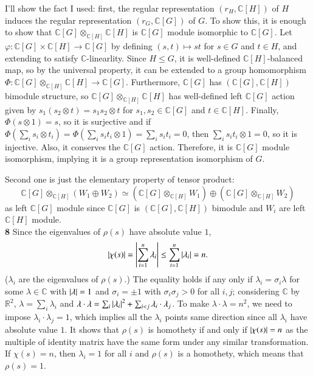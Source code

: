 \documentclass[a4paper, 12pt]{article}
\theoremstyle{Mydefinition}
\theoremstyle{Mytheorem}
\begin{document}
I'll show the fact I used: first, the regular representation $(r_H, \mathbb{C}[H])$ of $H$ induces the regular representation $(r_G, \mathbb{C}[G])$ of $G$. To show this, it is enough to show that $\mathbb{C}[G]\otimes_{\mathbb{C}[H]}\mathbb{C}[H]$ is $\mathbb{C}[G]$ module isomorphic to $\mathbb{C}[G]$. Let $\varphi:\mathbb{C}[G]\times\mathbb{C}[H]\rightarrow \mathbb{C}[G]$ by defining $(s,t)\mapsto st$ for $s\in G$ and $t\in H$, and extending to satisfy $\mathbb{C}$-linearlity. Since $H\leq G$, it is well-defined $\mathbb{C}[H]$-balanced map, so by the universal property, it can be extended to a group homomorphism $\Phi:\mathbb{C}[G]\otimes_{\mathbb{C}[H]}\mathbb{C}[H]\rightarrow \mathbb{C}[G]$. Furthermore, $\mathbb{C}[G]$ has $(\mathbb{C}[G],\mathbb{C}[H])$ bimodule structure, so $\mathbb{C}[G]\otimes_{\mathbb{C}[H]}\mathbb{C}[H]$ has well-defined left $\mathbb{C}[G]$ action given by $s_1(s_2\otimes t) = s_1s_2\otimes t$ for $s_1,s_2\in \mathbb{C}[G]$ and $t \in \mathbb{C}[H]$. Finally, $\Phi(s\otimes 1) = s$, so it is surjective and if $\Phi(\sum_i s_i\otimes t_i) = \Phi(\sum_i s_it_i\otimes 1) = \sum_i s_i t_i = 0$, then $\sum_i s_it_i\otimes 1 = 0$, so it is injective. Also, it conserves the $\mathbb{C}[G]$ action. Therefore, it is $\mathbb{C}[G]$ module isomorphism, implying it is a group representation isomorphism of $G$.

Second one is just the elementary property of tensor product:
\begin{equation}
    \mathbb{C}[G]\otimes_{\mathbb{C}[H]}(W_1\oplus W_2) \simeq \left(\mathbb{C}[G]\otimes_{\mathbb{C}[H]}W_1\right)\oplus \left(\mathbb{C}[G]\otimes_{\mathbb{C}[H]}W_2\right)
\end{equation}
as left $\mathbb{C}[G]$ module since $\mathbb{C}[G]$ is $(\mathbb{C}[G],\mathbb{C}[H])$ bimodule and $W_i$ are left $\mathbb{C}[H]$ module.
\\

\noindent \textbf{8}
Since the eigenvalues of $\rho(s)$ have absolute value $1$,
\begin{equation}
    \abs{\chi(s)} = \abs{\sum_{i=1}^n \lambda_i}\leq \sum_{i=1}^n\abs{\lambda_i} = n.
\end{equation}
($\lambda_i$ are the eigenvalues of $\rho(s)$.) The equality holds if any only if $\lambda_i = \sigma_i \lambda$ for some $\lambda\in \mathbb{C}$ with $\abs{\lambda} = 1$ and $\sigma_i = \pm 1$ with $\sigma_i\sigma_j>0$ for all $i,j$; considering $\mathbb{C}$ by $\mathbb{R}^2$, $\lambda = \sum_i \lambda_i$ and $\lambda\cdot \lambda = \sum_i \abs{\lambda_i}^2 + \sum_{i<j}\lambda_i\cdot \lambda_j$. To make $\lambda\cdot \lambda = n^2$, we need to impose $\lambda_i\cdot \lambda_j = 1$, which implies all the $\lambda_i$ points same direction since all $\lambda_i$ have absolute value $1$. It shows that $\rho(s)$ is homothety if and only if $\abs{\chi(s)}= n$ as the multiple of identity matrix have the same form under any similar transformation. If $\chi(s) = n$, then $\lambda_i=1$ for all $i$ and $\rho(s)$ is a homothety, which means that $\rho(s) = 1$.\\
\end{document}
